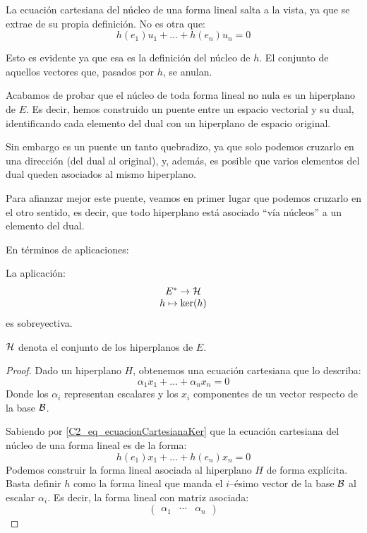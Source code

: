 La ecuación cartesiana del núcleo de una forma lineal salta a la vista, ya que se extrae de su propia definición. No es otra que:
\begin{equation}
	\label{C2_eq_ecuacionCartesianaKer}
	h(e_1)u_1+\dots+h(e_n)u_n=0
\end{equation}

Esto es evidente ya que esa es la definición del núcleo de $h$. El conjunto de aquellos vectores que, pasados por $h$, se anulan.

Acabamos de probar que el núcleo de toda forma lineal no nula es un hiperplano de $E$. Es decir, hemos construido un puente entre un espacio vectorial y su dual, identificando cada elemento del dual con un hiperplano de espacio original.

Sin embargo es un puente un tanto quebradizo, ya que solo podemos cruzarlo en una dirección (del dual al original), y, además, es posible que varios elementos del dual queden asociados al mismo hiperplano.

Para afianzar mejor este puente, veamos en primer lugar que podemos cruzarlo en el otro sentido, es decir, que todo hiperplano está asociado ``vía núcleos'' a un elemento del dual.

En términos de aplicaciones:
\begin{lem}
	\label{C2_lem_pseudocorrespondencia}
	La aplicación:
	\[\begin{array}{c}
	E^*\to\mathcal{H}\\
	h\mapsto \ker(h)
	\end{array}\]
	es sobreyectiva.
	
	$\mathcal{H}$ denota el conjunto de los hiperplanos de $E$.
\end{lem}
\begin{proof}
	Dado un hiperplano $H$, obtenemos una ecuación cartesiana que lo describa:
	\[\alpha_1x_1+\dots+\alpha_nx_n=0\]
	Donde los $\alpha_i$ representan escalares y los $x_i$ componentes de un vector respecto de la base $\mathcal{B}$.
		
	Sabiendo por \eqref{C2_eq_ecuacionCartesianaKer} que la ecuación cartesiana del núcleo de una forma lineal es de la forma:
	\[h(e_1)x_1+\dots+h(e_n)x_n=0\]
	Podemos construir la forma lineal asociada al hiperplano $H$ de forma explícita. Basta definir $h$ como la forma lineal que manda el $i$--ésimo vector de la base $\mathcal{B}$ al escalar $\alpha_i$. Es decir, la forma lineal con matriz asociada:
	\[\begin{pmatrix}
	\alpha_1 & \cdots & \alpha_n
	\end{pmatrix}\]
\end{proof}

